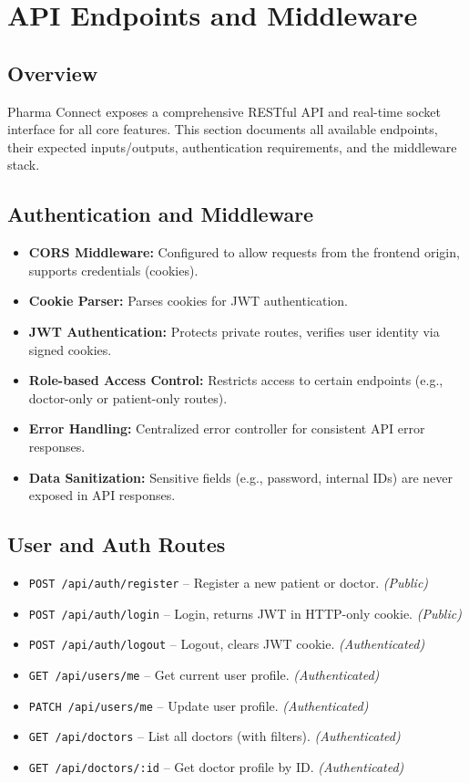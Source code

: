 \documentclass[12pt]{article}
\begin{document}


\section{API Endpoints and Middleware}

\subsection{Overview}
Pharma Connect exposes a comprehensive RESTful API and real-time socket interface for all core features. This section documents all available endpoints, their expected inputs/outputs, authentication requirements, and the middleware stack.

\subsection{Authentication and Middleware}
\begin{itemize}[leftmargin=1cm]
    \item \textbf{CORS Middleware:} Configured to allow requests from the frontend origin, supports credentials (cookies).
    \item \textbf{Cookie Parser:} Parses cookies for JWT authentication.
    \item \textbf{JWT Authentication:} Protects private routes, verifies user identity via signed cookies.
    \item \textbf{Role-based Access Control:} Restricts access to certain endpoints (e.g., doctor-only or patient-only routes).
    \item \textbf{Error Handling:} Centralized error controller for consistent API error responses.
    \item \textbf{Data Sanitization:} Sensitive fields (e.g., password, internal IDs) are never exposed in API responses.
\end{itemize}

\subsection{User and Auth Routes}
\begin{itemize}[leftmargin=1cm]
    \item \texttt{POST /api/auth/register} -- Register a new patient or doctor. \textit{(Public)}
    \item \texttt{POST /api/auth/login} -- Login, returns JWT in HTTP-only cookie. \textit{(Public)}
    \item \texttt{POST /api/auth/logout} -- Logout, clears JWT cookie. \textit{(Authenticated)}
    \item \texttt{GET /api/users/me} -- Get current user profile. \textit{(Authenticated)}
    \item \texttt{PATCH /api/users/me} -- Update user profile. \textit{(Authenticated)}
    \item \texttt{GET /api/doctors} -- List all doctors (with filters). \textit{(Authenticated)}
    \item \texttt{GET /api/doctors/:id} -- Get doctor profile by ID. \textit{(Authenticated)}
\end{itemize}
\end{document}
